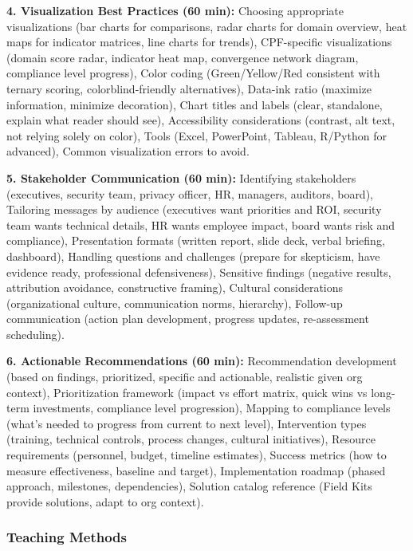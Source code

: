 \documentclass[11pt,a4paper]{article}
\begin{document}
\textbf{4. Visualization Best Practices (60 min):} Choosing appropriate visualizations (bar charts for comparisons, radar charts for domain overview, heat maps for indicator matrices, line charts for trends), CPF-specific visualizations (domain score radar, indicator heat map, convergence network diagram, compliance level progress), Color coding (Green/Yellow/Red consistent with ternary scoring, colorblind-friendly alternatives), Data-ink ratio (maximize information, minimize decoration), Chart titles and labels (clear, standalone, explain what reader should see), Accessibility considerations (contrast, alt text, not relying solely on color), Tools (Excel, PowerPoint, Tableau, R/Python for advanced), Common visualization errors to avoid.

\textbf{5. Stakeholder Communication (60 min):} Identifying stakeholders (executives, security team, privacy officer, HR, managers, auditors, board), Tailoring messages by audience (executives want priorities and ROI, security team wants technical details, HR wants employee impact, board wants risk and compliance), Presentation formats (written report, slide deck, verbal briefing, dashboard), Handling questions and challenges (prepare for skepticism, have evidence ready, professional defensiveness), Sensitive findings (negative results, attribution avoidance, constructive framing), Cultural considerations (organizational culture, communication norms, hierarchy), Follow-up communication (action plan development, progress updates, re-assessment scheduling).

\textbf{6. Actionable Recommendations (60 min):} Recommendation development (based on findings, prioritized, specific and actionable, realistic given org context), Prioritization framework (impact vs effort matrix, quick wins vs long-term investments, compliance level progression), Mapping to compliance levels (what's needed to progress from current to next level), Intervention types (training, technical controls, process changes, cultural initiatives), Resource requirements (personnel, budget, timeline estimates), Success metrics (how to measure effectiveness, baseline and target), Implementation roadmap (phased approach, milestones, dependencies), Solution catalog reference (Field Kits provide solutions, adapt to org context).

\subsubsection{Teaching Methods}
\end{document}
